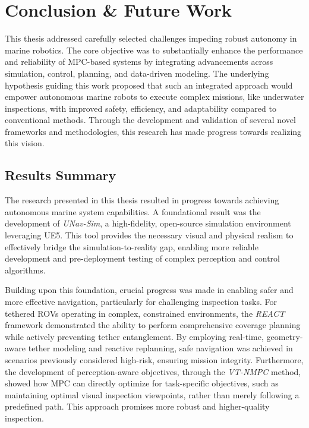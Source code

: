 \chapter{Conclusion \& Future Work}
This thesis addressed carefully selected challenges impeding robust autonomy in marine robotics. The core objective was to substantially enhance the performance and reliability of \ac{MPC}-based systems by integrating advancements across simulation, control, planning, and data-driven modeling. The underlying hypothesis guiding this work proposed that such an integrated approach would empower autonomous marine robots to execute complex missions, like underwater inspections, with improved safety, efficiency, and adaptability compared to conventional methods. Through the development and validation of several novel frameworks and methodologies, this research has made progress towards realizing this vision.

\section{Results Summary}


\label{sec:summary_contributions}

The research presented in this thesis resulted in progress towards achieving autonomous marine system capabilities. A foundational result was the development of \textit{UNav-Sim}, a high-fidelity, open-source simulation environment leveraging UE5. This tool provides the necessary visual and physical realism to effectively bridge the simulation-to-reality gap, enabling more reliable development and pre-deployment testing of complex perception and control algorithms.

Building upon this foundation, crucial progress was made in enabling safer and more effective navigation, particularly for challenging inspection tasks. For tethered \acp{ROV} operating in complex, constrained environments, the \textit{REACT} framework demonstrated the ability to perform comprehensive coverage planning while actively preventing tether entanglement. By employing real-time, geometry-aware tether modeling and reactive replanning, safe navigation was achieved in scenarios previously considered high-risk, ensuring mission integrity. Furthermore, the development of perception-aware objectives, through the \textit{VT-NMPC} method, showed how \ac{MPC} can directly optimize for task-specific objectives, such as maintaining optimal visual inspection viewpoints, rather than merely following a predefined path. This approach promises more robust and higher-quality inspection.

